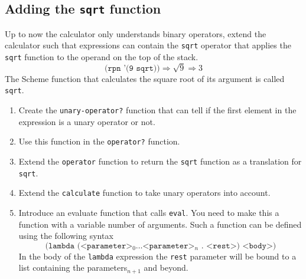 \documentclass[12pt,a4paper,english,twoside]{article}
\begin{document}
\subsection{Adding the \texttt{sqrt} function}
Up to now the calculator only understands binary operators, extend the 
calculator such that expressions can contain the \texttt{sqrt} operator that 
applies the \texttt{sqrt} function to the operand on the top of the stack.  
\begin{equation*}
  \texttt{(rpn '(9 sqrt))} \Rightarrow \sqrt{9} \Rightarrow 3
\end{equation*}
The Scheme function that calculates the square root of its argument is called 
\texttt{sqrt}.
\begin{enumerate}
  \item Create the \texttt{unary-operator?} function that can tell if the 
    first element in the expression is a unary operator or not. 
  \item Use this function in the \texttt{operator?} function.
  \item Extend the \texttt{operator} function to return the \texttt{sqrt} function as a 
    translation for \texttt{sqrt}.
  \item Extend the \texttt{calculate} function to take unary operators into 
    account.
  \item Introduce an evaluate function that calls \texttt{eval}. You need to 
    make this a function with a variable number of arguments. Such a function 
    can be defined using the following syntax
    \begin{equation*}
      \texttt{(lambda (<parameter>$_{0} \dots $<parameter>$_{n}$ . <rest>) <body>)}
    \end{equation*}
    In the body of the \texttt{lambda} expression the \texttt{rest} parameter 
    will be bound to a list containing the parameters$_{n+1}$ and beyond.
\end{enumerate}

\end{document}
